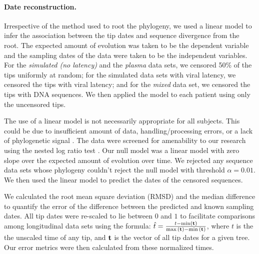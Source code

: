 \documentclass[12pt]{article}
\begin{document}
\paragraph * {Date reconstruction.} \label{subsec:daterecon}

Irrespective of the method used to root the phylogeny, we used a linear model to infer the association between the tip dates and sequence divergence from the root. 
The expected amount of evolution was taken to be the dependent variable and the sampling dates of the data were taken to be the independent variables.
For the \emph{simulated (no latency)} and the \emph{plasma} data sets, we censored 50\% of the tips uniformly at random; for the simulated data sets with viral latency, we censored the tips with viral latency; and for the \emph{mixed} data set, we censored the tips with DNA sequences.
We then applied the model to each patient using only the uncensored tips.

The use of a linear model is not necessarily appropriate for all subjects.
This could be due to insufficient amount of data, handling/processing errors, or a lack of phylogenetic signal \cite{Tempest}.
The data were screened for amenability to our research using the nested log ratio test \cite{Ho14}. 
Our null model was a linear model with zero slope over the expected amount of evolution over time.
We rejected any sequence data sets whose phylogeny couldn't reject the null model with threshold $\alpha=0.01$.
We then used the linear model to predict the dates of the censored sequences.

We calculated the root mean square deviation (RMSD) and the median difference to quantify the error of the difference between the predicted and known sampling dates.
All tip dates were re-scaled to lie between $0$ and $1$ to facilitate comparisons among longitudinal data sets using the formula: $\hat{t} = \frac{t - \min(\bf{t}) }{ \max{(\bf{t})} - \min{(\bf{t}})}$, where $t$ is the the unscaled time of any tip, and $\bf{t}$ is the vector of all tip dates for a given tree. 
Our error metrics were then calculated from these normalized times.%
\end{document}
